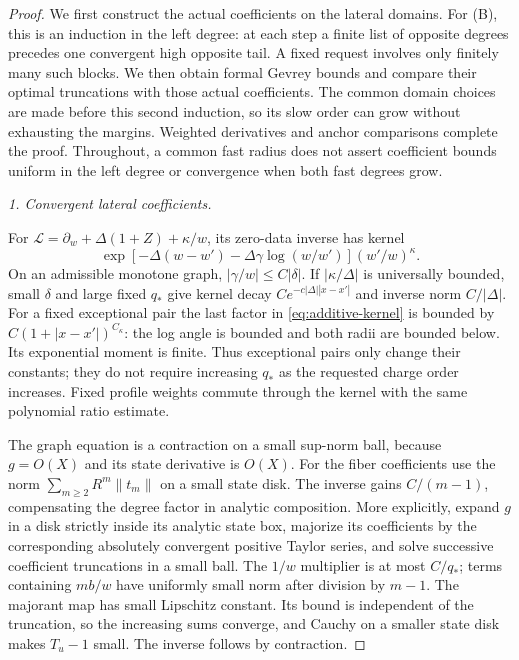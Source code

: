 \begin{proof}
We first construct the actual coefficients on the lateral domains.
For (B), this is an induction in the left degree: at each step a finite
list of opposite degrees precedes one convergent high opposite tail.
A fixed request involves only finitely many such blocks.
We then obtain formal Gevrey bounds and compare their optimal truncations
with those actual coefficients.  The common domain choices are made
before this second induction, so its slow order can grow without
exhausting the margins.  Weighted derivatives and anchor comparisons
complete the proof.  Throughout, a common fast radius does not assert
coefficient bounds uniform in the left degree or convergence when both
fast degrees grow.

\emph{1. Convergent lateral coefficients.}

For $\mathcal L=\partial_w+\Delta(1+Z)+\kappa/w$, its zero-data
inverse has kernel
\begin{equation}\label{eq:additive-kernel}
 \exp[-\Delta(w-w')-\Delta\gamma\log(w/w')]
                    (w'/w)^\kappa.
\end{equation}
On an admissible monotone graph, $|\gamma/w|\le C|\delta|$.
If $|\kappa/\Delta|$ is universally bounded, small $\delta$ and
large fixed $q_*$ give kernel decay $Ce^{-c|\Delta||x-x'|}$
and inverse norm $C/|\Delta|$.  For a fixed exceptional pair the last
factor in \eqref{eq:additive-kernel} is bounded by
$C(1+|x-x'|)^{C_\kappa}$: the log angle is bounded and both radii are
bounded below.  Its exponential moment is finite.  Thus exceptional
pairs only change their constants; they do not require increasing
$q_*$ as the requested charge order increases.  Fixed profile weights
commute through the kernel with the same polynomial ratio estimate.

The graph equation is a contraction on a small sup-norm ball, because
$g=O(X)$ and its state derivative is $O(X)$.
For the fiber coefficients use the norm $\sum_{m\ge2}R^m\|t_m\|$ on a
small state disk.  The inverse gains $C/(m-1)$, compensating the degree
factor in analytic composition.  More explicitly, expand $g$ in a disk
strictly inside its analytic state box, majorize its coefficients by
the corresponding absolutely convergent positive Taylor series, and
solve successive coefficient truncations in a small ball.  The
$1/w$ multiplier is at most $C/q_*$; terms containing $mb/w$ have
uniformly small norm after division by $m-1$.  The majorant map has
small Lipschitz constant.  Its bound is independent of the truncation,
so the increasing sums converge, and Cauchy on a smaller state disk
makes $T_u-1$ small.  The inverse follows by contraction.


\end{proof}
